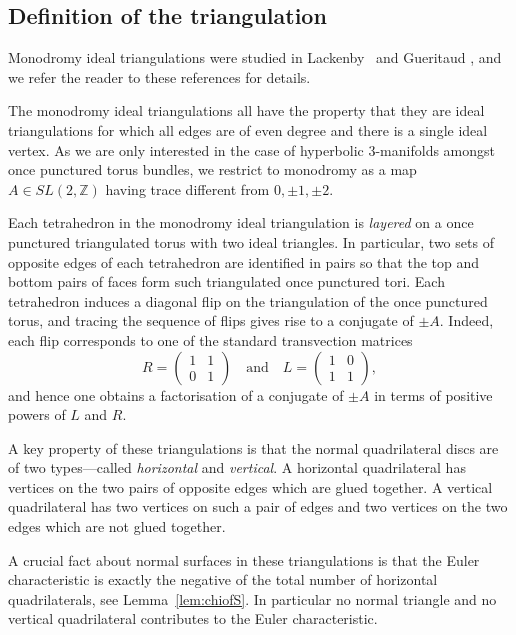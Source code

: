 \documentclass[a4paper]{gtart}
\def\Z{\mathbb{Z}}
\theoremstyle{plain}
\theoremstyle{definition}
\theoremstyle{remark}
\numberwithin{equation}{section}
\begin{document}

\subsection{Definition of the triangulation}
\label{sec:mit}

Monodromy ideal triangulations were studied in Lackenby~\cite{Lackenby-canonical-2003} and 
Gueritaud \cite{Gueritaud-canonical-2006}, and we refer the reader to these references for details. 

The monodromy ideal triangulations all have the property that they are ideal triangulations for which all edges are of even degree and there is a single ideal vertex. As we are only interested in the case of hyperbolic 3-manifolds amongst once punctured torus bundles, we restrict to monodromy as a map $A \in SL(2,\Z)$ having trace different from $0,\pm 1, \pm 2.$ 

Each tetrahedron in the monodromy ideal triangulation is \textit{layered} on a once punctured triangulated torus with two ideal triangles. In particular, two sets of opposite edges of each tetrahedron are identified in pairs so that the top and bottom pairs of faces form such triangulated once punctured tori. Each tetrahedron induces a diagonal flip on the triangulation of the once punctured torus, and tracing the sequence of flips gives rise to a conjugate of $\pm A.$ Indeed, each flip corresponds to 
one of the standard transvection matrices
\[ 
R = \begin{pmatrix} 1 & 1 \\ 0 & 1 \end{pmatrix} 
\quad \text{and} \quad 
L = \begin{pmatrix} 1 & 0 \\ 1 & 1 \end{pmatrix},
\]
and hence one obtains a factorisation of a conjugate of $\pm A$ in terms of positive powers of $L$ and $R.$ 

A key property of these triangulations is that the normal quadrilateral discs are of two types---called \textit{horizontal} and \textit{vertical}. A horizontal quadrilateral has vertices on the two pairs of opposite edges which are glued together. A vertical quadrilateral has two vertices on such a pair of edges and two vertices on the two edges which are not glued together. 

A crucial fact about normal surfaces in these triangulations is that the Euler characteristic is exactly the negative of the total number of horizontal quadrilaterals, see Lemma~\ref{lem:chiofS}. In particular no normal triangle and no vertical quadrilateral contributes to the Euler characteristic. 
\end{document}

